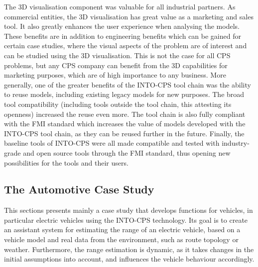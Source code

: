The 3D visualisation component was valuable for all industrial partners. As commercial entities, the 3D visualisation has great value as a marketing and sales tool. It also greatly enhances the user experience when analysing the models. These benefits are in addition to engineering benefits which can be gained for certain case studies, where the visual aspects of the problem are of interest and can be studied using the 3D visualisation. This is not the case for all CPS problems, but any CPS company can benefit from the 3D capabilities for marketing purposes, which are of high importance to any business. More generally, one of the greater benefits of the INTO-CPS tool chain was the ability to reuse models, including existing legacy models for new purposes. The broad tool compatibility (including tools outside the tool chain, this attesting its openness) increased the reuse even more. The tool chain is also fully compliant with the FMI standard which increases the value of models developed with the INTO-CPS tool chain, as they can be reused further in the future. Finally, the baseline tools of INTO-CPS were all made compatible and tested with industry-grade and open source tools through the FMI standard, thus opening new possibilities for the tools and their users.

\subsection{The Automotive Case Study} 

This sections presents mainly a case study that develops functions for vehicles, in particular electric vehicles using the INTO-CPS technology. Its goal is to create an assistant system for estimating the range of an electric vehicle, based on a vehicle model and real data from the environment, such as route topology or weather. Furthermore, the range estimation is dynamic, as it takes changes in the initial assumptions into account, and influences the vehicle behaviour accordingly. 


